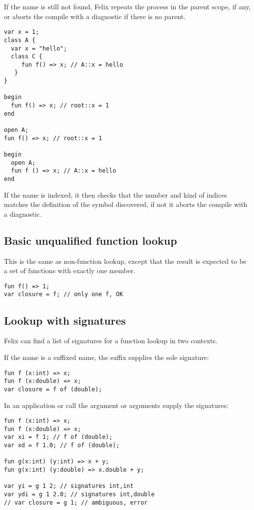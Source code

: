 \documentclass[oneside]{book}
\begin{document}
If the name is still not found, Felix repeats the process in
the parent scope, if any, or aborts the compile with
a diagnostic if there is no parent.

\begin{verbatim}
var x = 1;
class A {
  var x = "hello";
  class C {
     fun f() => x; // A::x = hello
   }
}

begin
  fun f() => x; // root::x = 1
end

open A;
fun f() => x; // root::x = 1

begin
  open A;
  fun f () => x; // A::x = hello
end
\end{verbatim}

If the name is indexed, it then checks that the number 
and kind of indices matches the definition of the symbol
discovered, if not it aborts the compile with a 
diagnostic.

\subsection{Basic unqualified function lookup}
This is the same as non-function lookup, except that
the result is expected to be a set of functions
with exactly one member.

\begin{verbatim}
fun f() => 1;
var closure = f; // only one f, OK
\end{verbatim}

\subsection{Lookup with signatures}
Felix can find a list of signatures for a function
lookup in two contexts.

If the name is a suffixed name, the suffix supplies
the sole signature:

\begin{verbatim}
fun f (x:int) => x;
fun f (x:double) => x;
var closure = f of (double);
\end{verbatim}

In an application or call the argument or arguments supply
the signatures:

\begin{verbatim}
fun f (x:int) => x;
fun f (x:double) => x;
var xi = f 1; // f of (double);
var xd = f 1.0; // f of (double);

fun g(x:int) (y:int) => x + y;
fun g(x:int) (y:double) => x.double + y;

var yi = g 1 2; // signatures int,int
var ydi = g 1 2.0; // signatures int,double
// var closure = g 1; // ambiguous, error
\end{verbatim}
\end{document}
